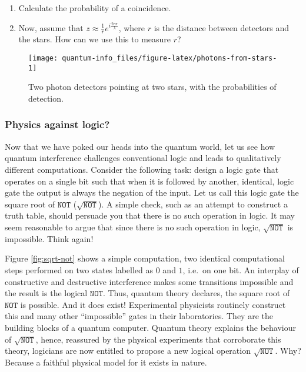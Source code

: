 \documentclass{article}
\providecommand{\tightlist}{%
  \setlength{\itemsep}{0pt}\setlength{\parskip}{0pt}}
\begin{document}
\begin{enumerate}
\def\labelenumi{\alph{enumi}.}
\tightlist
\item
  Calculate the probability of a coincidence.
\item
  Now, assume that \(z\approx \frac{1}{r}e^{i\frac{2r\pi}{\lambda}}\), where \(r\) is the distance between detectors and the stars. How can we use this to measure \(r\)?
\end{enumerate}

\begin{figure}[H]

{\centering \texttt{[image: quantum-info\_files/figure-latex/photons-from-stars-1]} 

}

\caption{Two photon detectors pointing at two stars, with the probabilities of detection.}\label{fig:photons-from-stars}
\end{figure}

\hypertarget{physics-against-logic}{%
\subsubsection{Physics against logic?}\label{physics-against-logic}}

Now that we have poked our heads into the quantum world, let us see how quantum interference challenges conventional logic and leads to qualitatively different computations.
Consider the following task: design a logic gate that operates on a single bit such that when it is followed by another, identical, logic gate the output is always the negation of the input.
Let us call this logic gate the square root of \(\texttt{NOT}\) (\(\sqrt{\texttt{NOT}}\)).
A simple check, such as an attempt to construct a truth table, should persuade you that there is no such operation in logic.
It may seem reasonable to argue that since there is no such operation in logic, \(\sqrt{\texttt{NOT}}\) is impossible.
Think again!

Figure \ref{fig:sqrt-not} shows a simple computation, two identical computational steps performed on two states labelled as \(0\) and \(1\), i.e.~on one bit.
An interplay of constructive and destructive interference makes some transitions impossible and the result is the logical \(\texttt{NOT}\).
Thus, quantum theory declares, the square root of \(\texttt{NOT}\) is possible.
And it does exist!
Experimental physicists routinely construct this and many other ``impossible'' gates in their laboratories.
They are the building blocks of a quantum computer.
Quantum theory explains the behaviour of \(\sqrt{\texttt{NOT}}\), hence, reassured by the physical experiments that corroborate this theory, logicians are now entitled to propose a new logical operation \(\sqrt{\texttt{NOT}}\).
Why?
Because a faithful physical model for it exists in nature.
\end{document}
